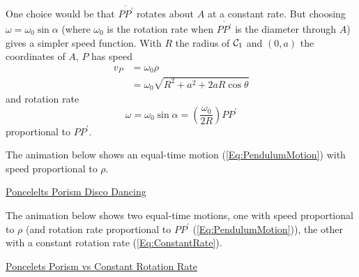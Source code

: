 \documentclass{ximera}
\begin{document}
One choice would be that $\overline{PP^\prime}$ rotates about $A$ at a constant rate. But choosing $\omega = \omega_0 \sin \alpha$ (where $\omega_0$ is the rotation rate when $\overline{PP^\prime}$ is the diameter through $A$) gives a simpler speed function. With $R$ the radius of ${\cal C}_1$ and $(0,a)$ the coordinates of $A$, $P$ has speed
\begin{align*}
   v_P &= \omega_0 \rho \\
          &= \omega_0  \sqrt{R^2 + a^2 + 2aR\cos\theta} 
\end{align*}
and rotation rate
\begin{equation}
   \omega = \omega_0 \sin\alpha = \left( \frac{\omega_0}{2R} \right) PP^\prime  \label{Eq:PendulumMotion}
\end{equation}
proportional to $PP^\prime$.

\begin{onlineOnly}
    \begin{center}
\end{center}
\end{onlineOnly}



\begin{exploration}
The animation below shows an equal-time motion (\ref{Eq:PendulumMotion}) with speed proportional to $\rho$.
\begin{onlineOnly}
    \begin{center}
\end{center}
\end{onlineOnly}

\href{https://www.desmos.com/calculator/g2o1szpkh5}{Poncelelts Porism Disco Dancing}
\end{exploration}

\begin{exploration}
The animation below shows two equal-time motions, one with speed proportional to $\rho$ (and rotation rate proportional to $PP^\prime$ (\ref{Eq:PendulumMotion})), the other with a constant rotation rate (\ref{Eq:ConstantRate}). 
\begin{onlineOnly}
    \begin{center}
\end{center}
\end{onlineOnly}

\href{https://www.desmos.com/calculator/xifdeg3wsq}{Poncelets Porism vs Constant Rotation Rate}

\end{exploration}
\end{document}
